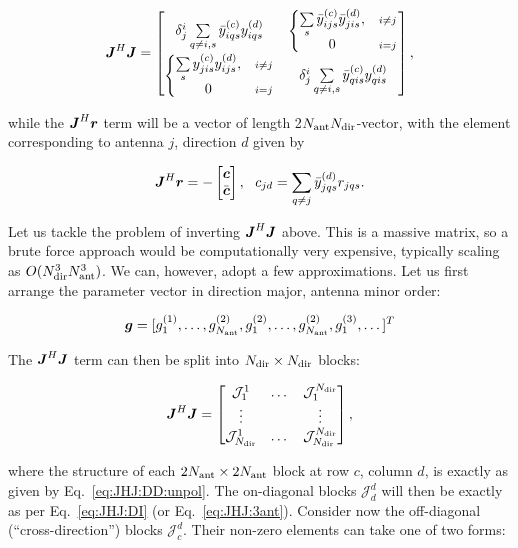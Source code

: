 \documentclass[useAMS,usenatbib]{mn2e}
\newcommand{\mat}[1]{{\bmath{#1}}}
\newcommand{\JJ}{\mat{J}} %
\newcommand{\JHJ}{\JJ^H\JJ} %
\begin{document}
\begin{equation}
\JHJ = \Matrix{cc}{
  \delta^i_j \sum\limits_{q\ne i,s} \yycH_{iqs} \yyd_{iqs}  & 
  \left \{ 
  \begin{array}{@{}cc@{}}
   \sum\limits_{s} \yycH_{ijs} \yydH_{jis}, & {\scriptstyle i\ne j}\\
   0 &{\scriptstyle i=j}
  \end{array} \right . 
  \\
  \left \{ 
  \begin{array}{@{}cc@{}}
   \sum\limits_{s} \yyc_{jis} \yyd_{ijs},&{\scriptstyle i\ne j} \\
   0 &{\scriptstyle i=j}
  \end{array} \right . 
  &
  \delta^i_j \sum\limits_{q\ne i,s} \yycH_{qis}\yyd_{qis}
},
\label{eq:JHJ:DD:unpol}
\end{equation}

while the $\JJ^H\bmath{r}$ term will be a vector of length 2$N_\mathrm{ant}N_\mathrm{dir}$-vector, with the element corresponding to 
antenna $j$, direction $d$ given by 

\[
\JJ^H\bmath{r} = -\Matrix{c}{\bmath{c}\\\bar{\bmath{c}}},~~c_{jd} = \sum\limits_{q\ne j} \yydH_{jqs} r_{jqs}.
\]

Let us tackle the problem of inverting $\JHJ$ above. This is a massive matrix, so a brute force 
approach would be computationally very expensive, typically scaling as $O(N_\mathrm{dir}^3N_\mathrm{ant}^3)$. We can, 
however, adopt a few approximations. Let us first arrange the parameter vector in direction 
major, antenna minor order:

\[
\bmath{g} = [g^{(1)}_1,\dots,g^{(2)}_{N_\mathrm{ant}},g^{(2)}_1,\dots,g^{(2)}_{N_\mathrm{ant}},g^{(3)}_1,\dots ]^T
\]

The $\JHJ$ term can then be split into $N_\mathrm{dir}\times N_\mathrm{dir}$ blocks:

\newcommand{\JJJ}{\mathcal{J}}

\begin{equation}
\label{eq:JHJ:DD:blocked}
\JHJ = \Matrix{ccc}{\JJJ^1_1 & \dots & \JJJ^{\Nd}_1 \\
\vdots & & \vdots \\
\JJJ_{\Nd}^1 & \dots & \JJJ_{\Nd}^{\Nd} },
\end{equation}

where the structure of each $2N_\mathrm{ant}\times2N_\mathrm{ant}$ block at row $c$, column $d$, is exactly as 
given by Eq.~\ref{eq:JHJ:DD:unpol}. The on-diagonal blocks $\JJJ^d_d$ will then be exactly as per 
Eq.~\ref{eq:JHJ:DI} (or Eq.~\ref{eq:JHJ:3ant}). Consider now the off-diagonal (``cross-direction'') 
blocks $\JJJ^d_c$. Their non-zero elements can take one of two forms:
\end{document}
